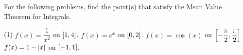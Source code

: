 \documentclass[mathNotesPreamble]{subfiles}
\begin{document}
\noindent
{}
\begin{ex*}
  For the following problems, find the point(s) that satisfy the Mean Value Theorem for Integrals.
\end{ex*}
\begin{tasks}[after-item-skip=\stretch{1}](1)
  \task $f(x)=\dfrac{1}{x^2}$ on ${\left[1,4\right]}$.
  \task $f(x)=e^x$ on ${\left[0,2\right]}$.
  \task $f(x)=\cos(x)$ on ${\left[-\dfrac{\pi}{2},\dfrac{\pi}{2}\right]}$
  \task $f(x)=1-{\left\vert x\right\vert}$ on ${\left[-1,1\right]}$.
\end{tasks}

\pagebreak
\end{document}
